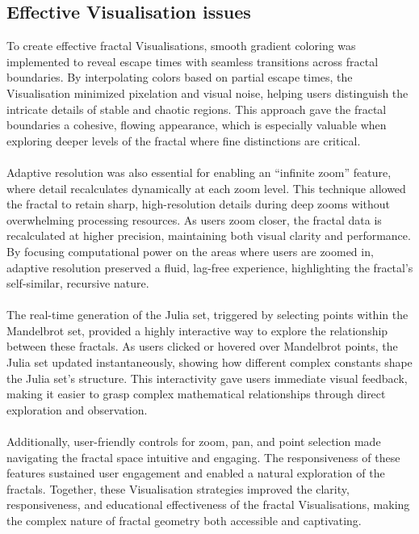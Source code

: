 \documentclass[12pt,a4paper]{report}
\begin{document}
\subsection{Effective Visualisation issues}
To create effective fractal Visualisations, smooth gradient coloring was implemented to reveal escape times with seamless transitions across fractal boundaries. By interpolating colors based on partial escape times, the Visualisation minimized pixelation and visual noise, helping users distinguish the intricate details of stable and chaotic regions. This approach gave the fractal boundaries a cohesive, flowing appearance, which is especially valuable when exploring deeper levels of the fractal where fine distinctions are critical. 
\\\\
Adaptive resolution was also essential for enabling an “infinite zoom” feature, where detail recalculates dynamically at each zoom level. This technique allowed the fractal to retain sharp, high-resolution details during deep zooms without overwhelming processing resources. As users zoom closer, the fractal data is recalculated at higher precision, maintaining both visual clarity and performance. By focusing computational power on the areas where users are zoomed in, adaptive resolution preserved a fluid, lag-free experience, highlighting the fractal’s self-similar, recursive nature. 
\\\\
The real-time generation of the Julia set, triggered by selecting points within the Mandelbrot set, provided a highly interactive way to explore the relationship between these fractals. As users clicked or hovered over Mandelbrot points, the Julia set updated instantaneously, showing how different complex constants shape the Julia set’s structure. This interactivity gave users immediate visual feedback, making it easier to grasp complex mathematical relationships through direct exploration and observation. 
\\\\
Additionally, user-friendly controls for zoom, pan, and point selection made navigating the fractal space intuitive and engaging. The responsiveness of these features sustained user engagement and enabled a natural exploration of the fractals. Together, these Visualisation strategies improved the clarity, responsiveness, and educational effectiveness of the fractal Visualisations, making the complex nature of fractal geometry both accessible and captivating. 
\end{document}
